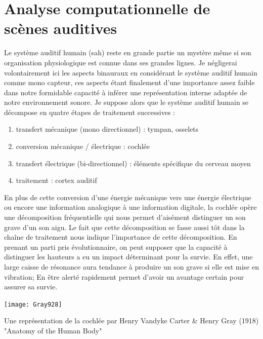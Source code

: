 
\section{\nmu Analyse computationnelle de scènes auditives} \label{sec:asa}

Le système auditif humain (sah) reste en grande partie un mystère même si son organisation physiologique est connue dans ses grandes lignes. Je négligerai volontairement ici les aspects binauraux en considérant le système auditif humain comme mono capteur, ces aspects étant finalement d'une importance assez faible dans notre formidable capacité à inférer une représentation interne adaptée de notre environnement sonore. Je suppose alors que le système auditif humain se décompose en quatre étapes de traitement successives :
\begin{enumerate}
  \item transfert mécanique (mono directionnel) : tympan, osselets
  \item conversion mécanique / électrique : cochlée
  \item transfert électrique (bi-directionnel) : éléments spécifique du cerveau moyen
  \item traitement : cortex auditif
\end{enumerate}

En plus de cette conversion d'une énergie mécanique vers une énergie électrique ou encore une information analogique à une information digitale, la cochlée opère une décomposition fréquentielle qui nous permet d'aisément distinguer un son grave d'un son aigu. Le fait que cette décomposition se fasse aussi tôt dans la chaîne de traitement nous indique l'importance de cette décomposition. En prenant un parti pris évolutionnaire, on peut supposer que la capacité à distinguer les hauteurs a eu un impact déterminant pour la survie. En effet, une large caisse de résonance aura tendance à produire un son grave si elle est mise en vibration; En être alerté rapidement permet d'avoir un avantage certain pour assurer sa survie.

\begin{marginfigure}
  \texttt{[image: Gray928]}
  \caption{Une représentation de la cochlée par Henry Vandyke Carter \& Henry Gray (1918) "Anatomy of the Human Body"} %
\end{marginfigure}

